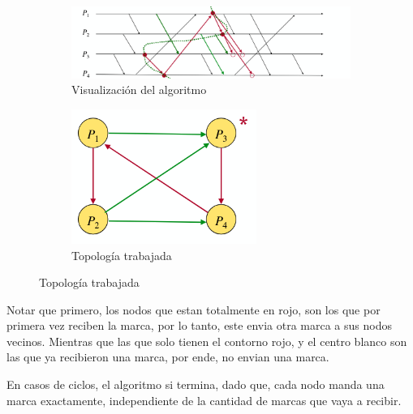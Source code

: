 \begin{figure}[H]
  \centering
  \captionsetup[subfigure]{labelformat=empty}
  \begin{subfigure}[b]{0.3\textwidth}
    \includegraphics[width=\textwidth]{img/Chandy_ver.png}
    \caption{Visualización del algoritmo}
  \end{subfigure}
  \hspace{2mm} %
  \begin{subfigure}[b]{0.2\textwidth}
    \includegraphics[width=\textwidth]{img/Topologia.png}
    \caption{Topología trabajada}
  \end{subfigure}
  \label{fig:imagenes_lado_a_lado}
\end{figure}
Notar que primero, los nodos que estan totalmente en rojo, son los que por primera vez reciben la marca, por lo tanto, este envia otra marca a sus nodos vecinos. Mientras que las que solo tienen el contorno rojo, y el centro blanco son las que ya recibieron una marca, por ende, no envian una marca.

En casos de ciclos, el algoritmo si termina, dado que, cada nodo manda una marca exactamente, independiente de la cantidad de marcas que vaya a recibir. 

